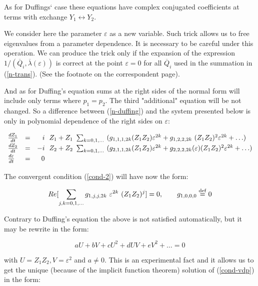 \noindent
As for Duffings` case these equations have complex conjugated 
coefficients at terms with exchange $Y_1 \leftrightarrow Y_2$.

We consider here the  parameter $\varepsilon$ as a new variable.
Such trick allows us to free eigenvalues from a parameter 
dependence. It is necessary to be careful under this operation. We
can produce the trick only if the expansion of the expression $1/
(\overline{Q}_i,\overline{\lambda}(\varepsilon))$ is correct
at the point $\varepsilon = 0$ for all $\overline{Q}_i$ 
used in the summation in (\ref{n-trans}). (See the footnote on 
the correspondent page).

And as for Duffing's equation sums at the right sides of the 
normal form  will include only terms where $p_1 = p_2$. The third 
"additional" equation will be not changed.
So a difference between (\ref{n-duffing}) and the system presented
below is only in polynomial 
dependence of the right sides on $\varepsilon$:

\begin{equation}
\label{n-vdp}
\begin{array}{lcrl}
\frac{\mathstrut dZ_1}{\mathstrut dt}& = &  i &\!\! Z_1 
+ Z_1\ \sum_{k=0,1,\ldots}\ (g_{1,1,1,2k} (Z_1 Z_2) \varepsilon^{2k} + 
        g_{1,2,2,2k}\ (Z_1 Z_2)^2 \varepsilon^{2k}
         + \ldots)\\
\frac{\mathstrut dZ_2}{\mathstrut dt}& = & -i &\!\! Z_2
+ Z_2\ \sum_{k=0,1,\ldots}\ (g_{2,1,1,2k} (Z_1 Z_2) \varepsilon^{2k} + 
        g_{2,2,2,2k}(\varepsilon) (Z_1 Z_2)^2 \varepsilon^{2k} + \ldots)\\
\frac{\mathstrut d\varepsilon}{\mathstrut dt}& = &0&
\end{array}
\end{equation}

The convergent condition (\ref{cond-2}) will have now the form:

\begin{equation}
\label{cond-vdp}
Re[\sum_{j,k=0,1,\ldots} g_{1,j,j,2k} \ \varepsilon^{2k} \ 
(Z_1 Z_2)^j] = 0,\qquad 
g_{1,0,0,0} \stackrel{\rm def}{=} 0
\end{equation}

Contrary to Duffing's equation the above is not satisfied automatically,
but it may be rewrite in the form:

$$
a U + b V + c U^2 +d U V + e V^2 + \ldots = 0
$$

\noindent 
with $U = Z_1 Z_2, V = \varepsilon^2$ and $a \neq 0$.
This is an experimental fact and it allows us 
to get the unique (because of the implicit function theorem)
solution of (\ref{cond-vdp}) in the form:


